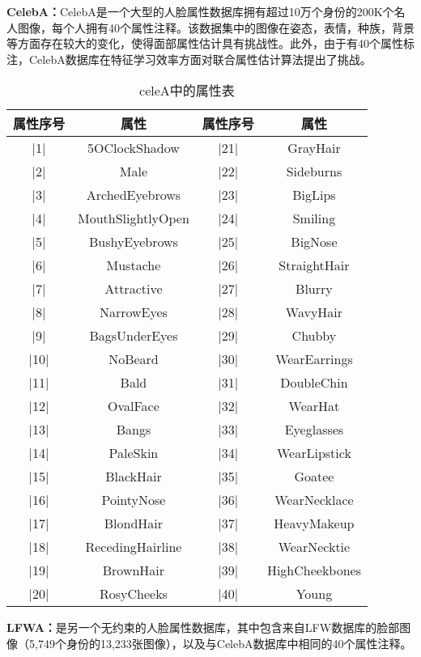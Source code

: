 \textbf{CelebA：}CelebA是一个大型的人脸属性数据库拥有超过10万个身份的200K个名人图像，每个人拥有40个属性注释。该数据集中的图像在姿态，表情，种族，背景等方面存在较大的变化，使得面部属性估计具有挑战性。此外，由于有40个属性标注，CelebA数据库在特征学习效率方面对联合属性估计算法提出了挑战。
 \begin{table}
  \centering
   \caption{celeA中的属性表}
   \label{tab:req-pkg}
   \begin{tabular}{c|c|c|c}
     \toprule
     属性序号 & 属性 &属性序号 & 属性 \\
     \midrule
     |1|  & 5OClockShadow		 & |21| & GrayHair \\
     |2|  & Male 				 		 & |22| & Sideburns \\
     |3|  & ArchedEyebrows  	 & |23| & BigLips \\
     |4|  & MouthSlightlyOpen  & |24| & Smiling \\
     |5|  & BushyEyebrows  		 & |25| & BigNose \\
     |6|  & Mustache           & |26| & StraightHair \\
     |7|  & Attractive         & |27| & Blurry\\   
     |8|  & NarrowEyes 			 & |28| & WavyHair \\
     |9|  & BagsUnderEyes  		 & |29| & Chubby \\  
     |10| & NoBeard            & |30| & WearEarrings\\   
     |11| & Bald               & |31| & DoubleChin  \\
     |12| & OvalFace           & |32| & WearHat \\
     |13| & Bangs              & |33| & Eyeglasses \\
     |14| & PaleSkin           & |34| & WearLipstick \\
     |15| & BlackHair          & |35| & Goatee \\
     |16| & PointyNose         & |36| & WearNecklace \\
     |17| & BlondHair          & |37| & HeavyMakeup\\
     |18| & RecedingHairline 	 & |38| & WearNecktie\\
     |19| & BrownHair          & |39| & HighCheekbones\\
     |20| & RosyCheeks 			 & |40| & Young\\
     \bottomrule
   \end{tabular}
 \end{table}

\textbf{LFWA：}\cite{LFWA}是另一个无约束的人脸属性数据库，其中包含来自LFW数据库的脸部图像（5,749个身份的13,233张图像），以及与CelebA数据库中相同的40个属性注释。

